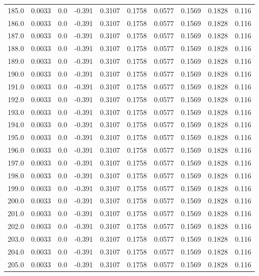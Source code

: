 \begin{longtable}{lrrrrrrrrr}
185.0 & 0.0033 & 0.0 & -0.391 & 0.3107 & 0.1758 & 0.0577 & 0.1569 & 0.1828 & 0.116 \\
186.0 & 0.0033 & 0.0 & -0.391 & 0.3107 & 0.1758 & 0.0577 & 0.1569 & 0.1828 & 0.116 \\
187.0 & 0.0033 & 0.0 & -0.391 & 0.3107 & 0.1758 & 0.0577 & 0.1569 & 0.1828 & 0.116 \\
188.0 & 0.0033 & 0.0 & -0.391 & 0.3107 & 0.1758 & 0.0577 & 0.1569 & 0.1828 & 0.116 \\
189.0 & 0.0033 & 0.0 & -0.391 & 0.3107 & 0.1758 & 0.0577 & 0.1569 & 0.1828 & 0.116 \\
190.0 & 0.0033 & 0.0 & -0.391 & 0.3107 & 0.1758 & 0.0577 & 0.1569 & 0.1828 & 0.116 \\
191.0 & 0.0033 & 0.0 & -0.391 & 0.3107 & 0.1758 & 0.0577 & 0.1569 & 0.1828 & 0.116 \\
192.0 & 0.0033 & 0.0 & -0.391 & 0.3107 & 0.1758 & 0.0577 & 0.1569 & 0.1828 & 0.116 \\
193.0 & 0.0033 & 0.0 & -0.391 & 0.3107 & 0.1758 & 0.0577 & 0.1569 & 0.1828 & 0.116 \\
194.0 & 0.0033 & 0.0 & -0.391 & 0.3107 & 0.1758 & 0.0577 & 0.1569 & 0.1828 & 0.116 \\
195.0 & 0.0033 & 0.0 & -0.391 & 0.3107 & 0.1758 & 0.0577 & 0.1569 & 0.1828 & 0.116 \\
196.0 & 0.0033 & 0.0 & -0.391 & 0.3107 & 0.1758 & 0.0577 & 0.1569 & 0.1828 & 0.116 \\
197.0 & 0.0033 & 0.0 & -0.391 & 0.3107 & 0.1758 & 0.0577 & 0.1569 & 0.1828 & 0.116 \\
198.0 & 0.0033 & 0.0 & -0.391 & 0.3107 & 0.1758 & 0.0577 & 0.1569 & 0.1828 & 0.116 \\
199.0 & 0.0033 & 0.0 & -0.391 & 0.3107 & 0.1758 & 0.0577 & 0.1569 & 0.1828 & 0.116 \\
200.0 & 0.0033 & 0.0 & -0.391 & 0.3107 & 0.1758 & 0.0577 & 0.1569 & 0.1828 & 0.116 \\
201.0 & 0.0033 & 0.0 & -0.391 & 0.3107 & 0.1758 & 0.0577 & 0.1569 & 0.1828 & 0.116 \\
202.0 & 0.0033 & 0.0 & -0.391 & 0.3107 & 0.1758 & 0.0577 & 0.1569 & 0.1828 & 0.116 \\
203.0 & 0.0033 & 0.0 & -0.391 & 0.3107 & 0.1758 & 0.0577 & 0.1569 & 0.1828 & 0.116 \\
204.0 & 0.0033 & 0.0 & -0.391 & 0.3107 & 0.1758 & 0.0577 & 0.1569 & 0.1828 & 0.116 \\
205.0 & 0.0033 & 0.0 & -0.391 & 0.3107 & 0.1758 & 0.0577 & 0.1569 & 0.1828 & 0.116 \\

\end{longtable}
